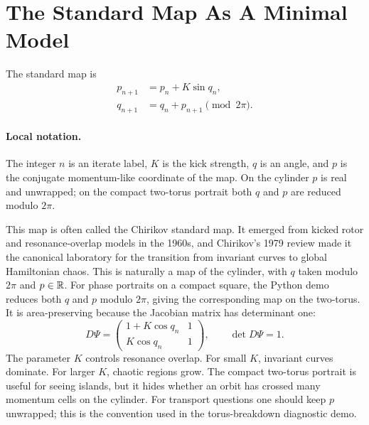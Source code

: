 \section{The Standard Map As A Minimal Model}
\label{sec:standard-map}

The standard map is
\[
\begin{aligned}
  p_{n+1} &= p_n+K\sin q_n,\\
  q_{n+1} &= q_n+p_{n+1}\pmod{2\pi}.
\end{aligned}
\]

\paragraph{Local notation.}
The integer \(n\) is an iterate label, \(K\) is the kick strength, \(q\) is an
angle, and \(p\) is the conjugate momentum-like coordinate of the map.  On the
cylinder \(p\) is real and unwrapped; on the compact two-torus portrait both
\(q\) and \(p\) are reduced modulo \(2\pi\).

This map is often called the Chirikov standard map. It emerged from kicked
rotor and resonance-overlap models in the 1960s, and Chirikov's 1979 review made
it the canonical laboratory for the transition from invariant curves to global
Hamiltonian chaos.
This is naturally a map of the cylinder, with \(q\) taken modulo \(2\pi\) and
\(p\in\mathbb{R}\). For phase portraits on a compact square, the Python demo reduces
both \(q\) and \(p\) modulo \(2\pi\), giving the corresponding map on the
two-torus.
It is area-preserving because the Jacobian matrix has determinant one:
\[
  D\Psi=
  \begin{pmatrix}
  1+K\cos q_n & 1\\
  K\cos q_n & 1
  \end{pmatrix},
  \qquad
  \det D\Psi=1.
\]
The parameter \(K\) controls resonance overlap. For small \(K\), invariant
curves dominate. For larger \(K\), chaotic regions grow.
The compact two-torus portrait is useful for seeing islands, but it hides
whether an orbit has crossed many momentum cells on the cylinder. For transport
questions one should keep \(p\) unwrapped; this is the convention used in the
torus-breakdown diagnostic demo.

